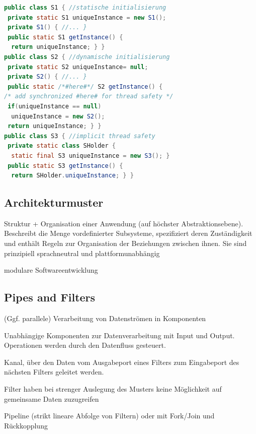 \documentclass[a4paper,fontsize=9pt, DIV=calc]{scrartcl}
\begin{document}
\begin{multicols}{2}
\begin{minipage}{0.29\linewidth}
\end{minipage}\hspace{1mm}%
\begin{minipage}{0.70\linewidth}
\begin{lstlisting}[style=siemens, language=Java]
public class S1 { //statische initialisierung
 private static S1 uniqueInstance = new S1();
 private S1() { //... }
 public static S1 getInstance() {
  return uniqueInstance; } }
public class S2 { //dynamische initialisierung
 private static S2 uniqueInstance= null;
 private S2() { //... }
 public static /*#here#*/ S2 getInstance() {
/* add synchronized #here# for thread safety */
 if(uniqueInstance == null)
  uniqueInstance = new S2();
 return uniqueInstance; } }
public class S3 { //implicit thread safety
 private static class SHolder {
  static final S3 uniqueInstance = new S3(); }
 public static S3 getInstance() {
  return SHolder.uniqueInstance; } }
\end{lstlisting}
\end{minipage}




\begin{multicols}{2}
\section{Architekturmuster}
\begin{description}[leftmargin=*]\itemsep-2mm
    \item[Beschreibt] Struktur + Organisation einer Anwendung (auf höchster Abstraktionsebene). Beschreibt die Menge vordefinierter Subsysteme, spezifiziert deren Zuständigkeit und enthält Regeln zur Organisation der Beziehungen zwischen ihnen. Sie sind prinzipiell sprachneutral und plattformunabhängig
\item[Voraussetzung] modulare Softwareentwicklung 
\end{description}

\subsection{Pipes and Filters}
(Ggf. parallele) Verarbeitung von Datenströmen in Komponenten
\begin{description}[leftmargin=*]\itemsep-2mm
\item[Filters (coroutines)] Unabhängige Komponenten zur Datenverarbeitung mit Input und Output. Operationen werden durch den Datenfluss gesteuert. 
\item[Pipes (streams)] Kanal, über den Daten vom Ausgabeport eines Filters zum Eingabeport des nächsten Filters geleitet werden.
\item[Implementierung] Filter haben bei strenger Auslegung des Musters keine Möglichkeit auf gemeinsame Daten zuzugreifen
\item[Varianten] Pipeline (strikt lineare Abfolge von Filtern) oder mit Fork/Join und Rückkopplung
\end{description}


\end{multicols}
\end{multicols}
\end{document}
